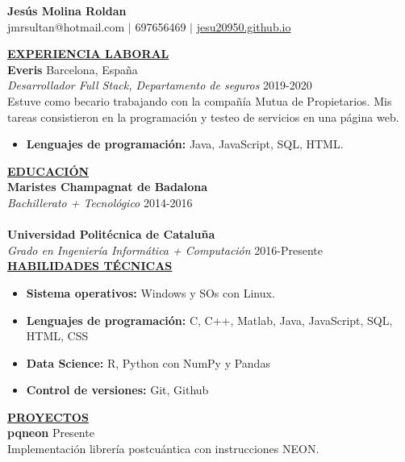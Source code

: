 \documentclass{article}
\begin{document}
	\begin{center}
		\thispagestyle{empty}
		\large \textbf{Jesús Molina Roldan\\}
		\normalsize jmr\textunderscore sultan@hotmail.com $\mid$ 697656469 $\mid$ \href{https://jesu20950.github.io/}{jesu20950.github.io} \\ 
		\hrulefill
	\end{center}
	
	\noindent \textbf{\underline{EXPERIENCIA LABORAL}} \\
	\noindent \textbf{Everis} \hfill Barcelona, España \\
	\textit{Desarrollador Full Stack, Departamento de seguros} \hfill 2019-2020 \\
	Estuve como becario trabajando con la compañía Mutua de Propietarios. Mis tareas consistieron en la programación y testeo de servicios en una página web.
	\begin{itemize}[noitemsep,nolistsep,leftmargin=*]
		\item {\textbf{Lenguajes de programación:} Java, JavaScript, SQL, HTML.}\\
	\end{itemize}
	

	\noindent \textbf{\underline{EDUCACIÓN}} \\
	\textbf{Maristes Champagnat de Badalona} \\
	\textit{Bachillerato + Tecnológico}  \hfill 2014-2016  \\ \\
	\textbf{Universidad Politécnica de Cataluña} \\
	\textit{Grado en Ingeniería Informática + Computación}  \hfill 2016-Presente \\
	

	\noindent \textbf{\underline{HABILIDADES TÉCNICAS}} \\
	\begin{itemize}[noitemsep,nolistsep,leftmargin=*]
		\item {\textbf{Sistema operativos:} Windows y SOs con Linux.}
		\item {\textbf{Lenguajes de programación:} C, C++, Matlab, Java, JavaScript, SQL, HTML, CSS}
		\item {\textbf{Data Science:} R, Python con NumPy y Pandas}
		\item {\textbf{Control de versiones:} Git, Github}\\
	\end{itemize}
	
		\noindent \textbf{\underline{PROYECTOS}} \\
	\noindent \textbf{pqneon}  \hfill  Presente \\
	Implementación librería postcuántica con instrucciones NEON. \\
\end{document}
